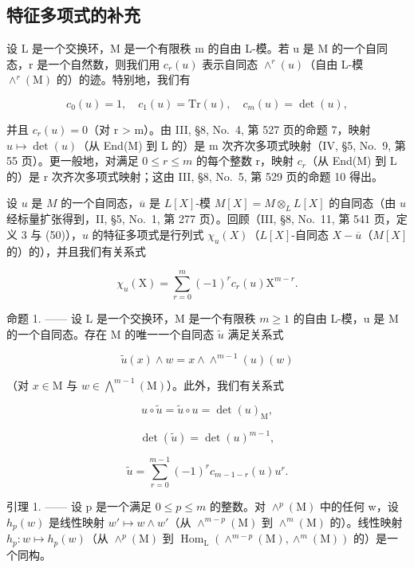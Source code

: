 \subsection{特征多项式的补充}

设 L 是一个交换环，M 是一个有限秩 m 的自由 L-模。若 u 是 M 的一个自同态，r 是一个自然数，则我们用 \(c_{r}(u)\) 表示自同态 \(\wedge^{r}(u)\)（自由 L-模 \(\wedge^{r}(\mathrm{M})\) 的）的迹。特别地，我们有

\[
c _ {0} (u) = 1, \quad c _ {1} (u) = \mathrm{Tr} (u), \quad c _ {m} (u) = \det (u),\tag{1}
\]

并且 \(c_{r}(u) = 0\)（对 r \textgreater{} m）。由 III, §8, No.~4, 第 527 页的命题 7，映射 \(u \mapsto \det(u)\)（从 End(M) 到 L 的）是 m 次齐次多项式映射（IV, §5, No.~9, 第 55 页）。更一般地，对满足 \(0 \leqslant r \leqslant m\) 的每个整数 r，映射 \(c_{r}\)（从 End(M) 到 L 的）是 r 次齐次多项式映射；这由 III, §8, No.~5, 第 529 页的命题 10 得出。

设 \(u\) 是 \(M\) 的一个自同态，\(\overline{u}\) 是 \(L[X]\)-模 \(M[X] = M \otimes_{L} L[X]\) 的自同态（由 \(u\) 经标量扩张得到，II, §5, No.~1, 第 277 页）。回顾（III, §8, No.~11, 第 541 页，定义 3 与 (50)），\(u\) 的特征多项式是行列式 \(\chi_u(X)\)（\(L[X]\)-自同态 \(X - \overline{u}\)（\(M[X]\) 的）的），并且我们有关系式

\[
\chi_ {u} (\mathrm{X}) = \sum_ {r = 0} ^ {m} (- 1) ^ {r} c _ {r} (u) \mathrm{X} ^ {m - r}.\tag{2}
\]

命题 1. —— 设 L 是一个交换环，M 是一个有限秩 \(m \geqslant 1\) 的自由 L-模，u 是 M 的一个自同态。存在 M 的唯一一个自同态 \(\widetilde{u}\) 满足关系式

\[
\widetilde {u} (x) \wedge w = x \wedge \wedge^ {m - 1} (u) (w)\tag{3}
\]

（对 \(x\in \mathrm{M}\) 与 \(w\in \bigwedge^{m - 1}(\mathrm{M})\)）。此外，我们有关系式

\[
u \circ \widetilde {u} = \widetilde {u} \circ u = \det (u) _ {\mathrm{M}},\tag{4}
\]

\[
\det (\widetilde {u}) = \det (u) ^ {m - 1},\tag{5}
\]

\[
\widetilde {u} = \sum_ {r = 0} ^ {m - 1} (- 1) ^ {r} c _ {m - 1 - r} (u) u ^ {r}.\tag{6}
\]

引理 1. —— 设 p 是一个满足 \(0 \leqslant p \leqslant m\) 的整数。对 \(\wedge^{p}(\mathrm{M})\) 中的任何 w，设 \(h_{p}(w)\) 是线性映射 \(w' \mapsto w \wedge w'\)（从 \(\wedge^{m-p}(\mathrm{M})\) 到 \(\wedge^{m}(\mathrm{M})\) 的）。线性映射 \(h_{p}: w \mapsto h_{p}(w)\)（从 \(\wedge^{p}(\mathrm{M})\) 到 \(\operatorname{Hom}_{\mathrm{L}}(\wedge^{m-p}(\mathrm{M}), \wedge^{m}(\mathrm{M}))\) 的）是一个同构。

